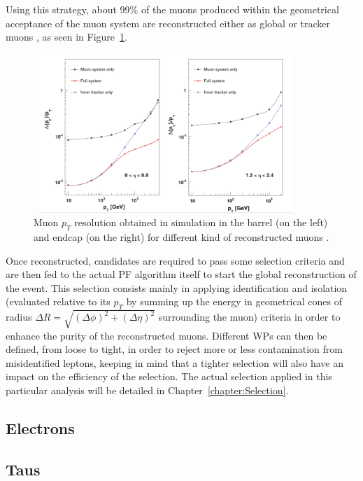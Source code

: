 \documentclass[a4paper, 10pt, openright]{report}
\begin{document}
Using this strategy, about 99\% of the muons produced within the geometrical acceptance of the muon system are reconstructed either as global or tracker muons \cite{MuonReco}, as seen in Figure~\ref{fig:MuonEff}.

\begin{figure}[htbp]
\begin{center}
\includegraphics[width=10cm, height=6cm]{figs/MuonEff.png}
\caption{Muon $p_T$ resolution obtained in simulation in the barrel (on the left) and endcap (on the right) for different kind of reconstructed muons \cite{Quarkonium}.}
\label{fig:MuonEff}
\end{center}
\end{figure}

Once reconstructed, candidates are required to pass some selection criteria and are then fed to the actual \ac{PF} algorithm itself to start the global reconstruction of the event. This selection consists mainly in applying identification and isolation (evaluated relative to its $p_T$ by summing up the energy in geometrical cones of radius $\Delta R = \sqrt{(\Delta \phi)^2 + (\Delta \eta)^2}$ surrounding the muon) criteria in order to enhance the purity of the reconstructed muons. Different \acfp{WP} can then be defined, from loose to tight, in order to reject more or less contamination from misidentified leptons, keeping in mind that a tighter selection will also have an impact on the efficiency of the selection. The actual selection applied in this particular analysis will be detailed in Chapter~\ref{chapter:Selection}.

\subsection{Electrons} \label{subsection:Electrons}



\subsection{Taus} \label{subsection:Taus}
\end{document}
